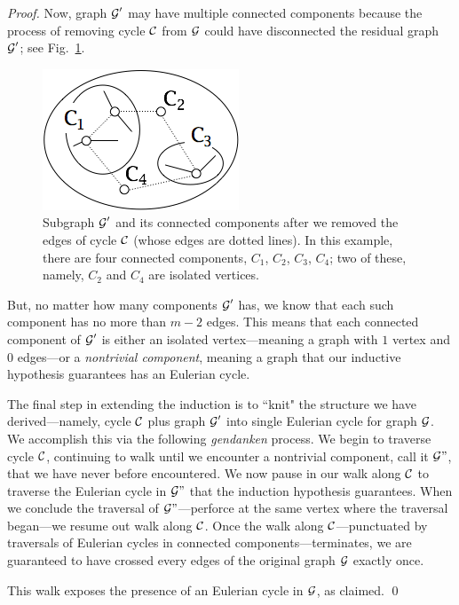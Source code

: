 \begin{proof}
Now,  graph $\mbox{$\cal G$}'$ may have multiple connected components because the process of 
removing cycle $\mbox{$\cal C$}$ from $\mbox{$\cal G$}$ could have disconnected the residual graph $\mbox{$\cal G$}'$; see
Fig.~\ref{fig:eulerianProof2}.
\begin{figure}[hbt]
\begin{center}
       \includegraphics[scale=0.5]{FiguresGraph/EulerianProof2}
       \caption{Subgraph $\mbox{$\cal G$}'$ and its connected components after we removed the 
       edges of cycle $\mbox{$\cal C$}$ (whose edges are dotted lines).  In this example, there are
       four connected components, $C_1$, $C_2$, $C_3$, $C_4$; two of these, namely,
       $C_2$ and $C_4$ are isolated vertices.}
  \label{fig:eulerianProof2}
\end{center}
\end{figure}
But, no matter how many components $\mbox{$\cal G$}'$ has, we know that each such component has no
more than $m-2$ edges.  This means that each connected component of $\mbox{$\cal G$}'$ is either an
isolated vertex---meaning a graph with $1$ vertex and $0$ edges---or a {\em nontrivial component},
meaning a graph that our inductive hypothesis guarantees has an Eulerian cycle.

\smallskip

The final step in extending the induction is to ``knit" the structure we have derived---namely,
cycle $\mbox{$\cal C$}$ plus graph $\mbox{$\cal G$}'$ into  single Eulerian cycle for graph $\mbox{$\cal G$}$.  We accomplish this 
via the following {\em gendanken} process.  We begin to traverse cycle $\mbox{$\cal C$}$, continuing
to walk until we encounter a nontrivial component, call it $\mbox{$\cal G$}"$, that we have never before
encountered.  We now pause in our walk along $\mbox{$\cal C$}$ to traverse the Eulerian cycle in $\mbox{$\cal G$}"$
that the induction hypothesis guarantees.  When we conclude the traversal of $\mbox{$\cal G$}"$---perforce
at the same vertex where the traversal began---we resume out walk along $\mbox{$\cal C$}$.  Once the
walk along $\mbox{$\cal C$}$---punctuated by traversals of Eulerian cycles in connected 
components---terminates, we are guaranteed to have crossed every edges of the original graph
$\mbox{$\cal G$}$ exactly once.

This walk exposes the presence of an Eulerian cycle in $\mbox{$\cal G$}$, as claimed.   \qed
\end{proof}

